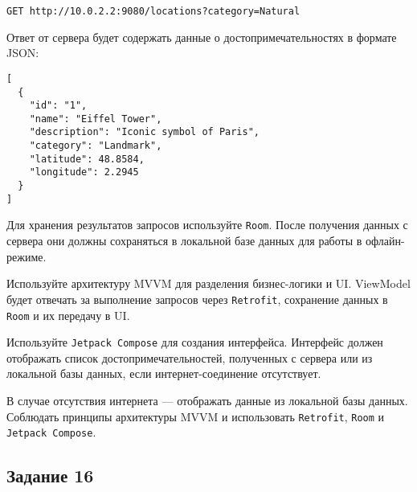 \documentclass[a4paper,12pt]{article}
\begin{document}
\begin{verbatim}
GET http://10.0.2.2:9080/locations?category=Natural
\end{verbatim}

Ответ от сервера будет содержать данные о достопримечательностях в формате JSON:

\begin{verbatim}
[
  {
    "id": "1",
    "name": "Eiffel Tower",
    "description": "Iconic symbol of Paris",
    "category": "Landmark",
    "latitude": 48.8584,
    "longitude": 2.2945
  }
]
\end{verbatim}

Для хранения результатов запросов используйте \texttt{Room}. После получения данных с сервера они должны сохраняться в локальной базе данных для работы в офлайн-режиме.

Используйте архитектуру MVVM для разделения бизнес-логики и UI. ViewModel будет отвечать за выполнение запросов через \texttt{Retrofit}, сохранение данных в \texttt{Room} и их передачу в UI.

Используйте \texttt{Jetpack Compose} для создания интерфейса. Интерфейс должен отображать список достопримечательностей, полученных с сервера или из локальной базы данных, если интернет-соединение отсутствует.

В случае отсутствия интернета — отображать данные из локальной базы данных.
Соблюдать принципы архитектуры MVVM и использовать \texttt{Retrofit}, \texttt{Room} и \texttt{Jetpack Compose}.

\subsection*{Задание 16}
\end{document}
